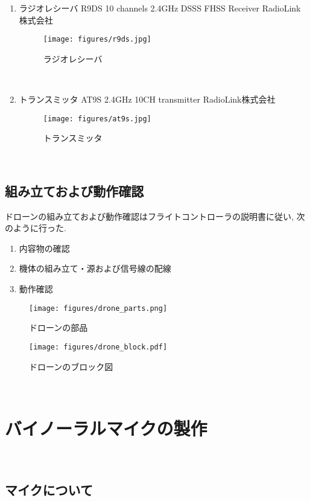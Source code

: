 \begin{enumerate}
\item
  ラジオレシーバ R9DS 10 channels 2.4GHz DSSS FHSS Receiver
  RadioLink株式会社
  \cite{r9ds:online}
  \begin{figure}[H]
  \centering
  \texttt{[image: figures/r9ds.jpg]}
  \caption{ラジオレシーバ}
  \label{fig:radio_reciever}
  \end{figure}
  \\

\item
  トランスミッタ AT9S 2.4GHz 10CH transmitter RadioLink株式会社
  \cite{at9s:online}
  \begin{figure}[H]
  \centering
  \texttt{[image: figures/at9s.jpg]}
  \caption{トランスミッタ}
  \label{fig:transmitter}
  \end{figure}
\end{enumerate}

\
\subsection{組み立ておよび動作確認}\label{assembly-drone}

ドローンの組み立ておよび動作確認はフライトコントローラの説明書\cite{quadrino_nano_instruction:online}に従い, 次のように行った. 

\begin{enumerate}
\renewcommand{\labelenumi}{(\arabic{enumi})}
\item
  内容物の確認
\item
  機体の組み立て・源および信号線の配線
\item
  動作確認
\end{enumerate}

\begin{figure}[H]
\centering
\texttt{[image: figures/drone\_parts.png]}
\caption{ドローンの部品}
\label{fig:drone_parts}
\end{figure}

\begin{figure}[H]
\centering
\texttt{[image: figures/drone\_block.pdf]}
\caption{ドローンのブロック図}
\label{fig:drone_block}
\end{figure}

\
\section{バイノーラルマイクの製作}\label{binaural-mic}

\
\subsection{マイクについて}\label{about-mic}

